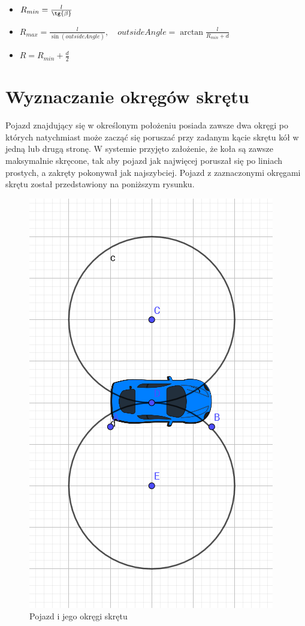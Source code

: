\documentclass[a4paper,11pt,twoside]{report}
\theoremstyle{definition}
\begin{document}
\begin{itemize}
	\item $R_{min} = \frac{l}{\tg{\beta}}$
	\item $R_{max} = \frac{l}{\sin{(outsideAngle)}}, \quad outsideAngle = \arctan{\frac{l}{R_{min} + d}}$
	\item $R = R_{min} + \frac{d}{2}$
\end{itemize}

\section{Wyznaczanie okręgów skrętu}

Pojazd znajdujący się w określonym położeniu posiada zawsze dwa okręgi po których natychmiast może zacząć się poruszać przy zadanym kącie skrętu kół w jedną lub drugą stronę. W systemie przyjęto założenie, że koła są zawsze maksymalnie skręcone, tak aby pojazd jak najwięcej poruszał się po liniach prostych, a zakręty pokonywał jak najszybciej. Pojazd z zaznaczonymi okręgami skrętu został przedstawiony na poniższym rysunku.

\begin{figure}[h!]
\centering
\includegraphics[scale=0.55]{vehicleWithTurningCircles}
\caption[Pojazd i jego okręgi skrętu]{Pojazd i jego okręgi skrętu}
\end{figure}
\end{document}
